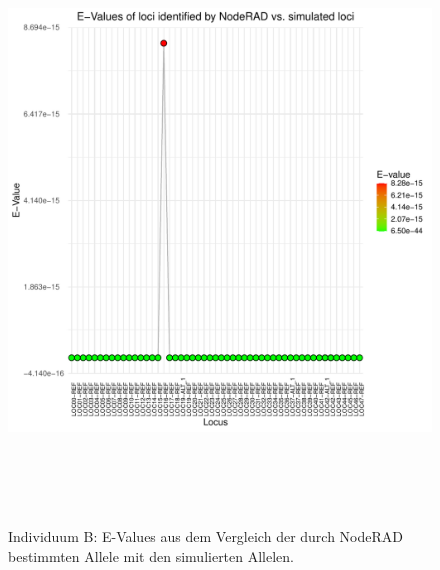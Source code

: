 \begin{figure}[H]
	\begin{center}
		\includegraphics[height=16cm]{bilder/evaluation/evalues/B.plot_evalues.pdf}
		\caption{Individuum B: E-Values aus dem Vergleich der durch NodeRAD bestimmten Allele mit den simulierten Allelen.}
	\end{center}
\end{figure}

